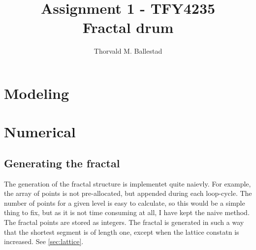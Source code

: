 \documentclass[a4paper, 12pt]{article}
\author{Thorvald M. Ballestad}
\title{Assignment 1 - TFY4235\\
  Fractal drum}
\begin{document}
\maketitle

\begin{abstract}

\end{abstract}

\section{Modeling}

\section{Numerical}
\subsection{Generating the fractal}
The generation of the fractal structure is implementet quite naievly.
For example, the array of points is not pre-allocated, but appended during each loop-cycle.
The number of points for a given level is easy to calculate, so this would be a simple thing to fix, but as it is not time consuming at all, I have kept the naive method.\\

The fractal points are stored as integers.
The fractal is generated in such a way that the shortest segment is of length one, except when the lattice constatn is increased.
See \ref{sec:lattice}.
\end{document}
